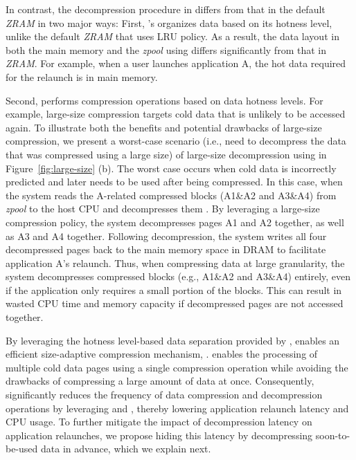  

In contrast, the decompression procedure in \proposal differs from that in the default \emph{ZRAM} in two major ways:
First, \proposal's \dataorg organizes data based on its hotness level, unlike the default \emph{ZRAM} that uses LRU policy. As a result, the data layout in both the main memory and the \emph{zpool} using \proposal differs significantly from that in \emph{ZRAM}. For example, when a user launches application A, the hot data required for the relaunch is in main memory. 

Second, \proposal performs compression operations based on data hotness levels. For example, large-size compression targets cold data that is unlikely to be accessed again. To illustrate both the benefits and potential drawbacks of large-size compression, we present a worst-case scenario (i.e., need to decompress the data that was compressed using a large size) of large-size decompression using \proposal in Figure~\ref{fig:large-size} (b). The worst case occurs when cold data is incorrectly predicted and later needs to be used after being compressed. In this case, when the system reads the A-related compressed blocks (A1\&A2 and A3\&A4) from  \emph{zpool} to the host CPU and decompresses them . By leveraging a large-size compression policy, the system decompresses pages A1 and A2 together, as well as A3 and A4 together. Following decompression, the system writes all four decompressed pages back to the main memory space in DRAM  to facilitate application A's relaunch. 
Thus, when compressing data at large granularity, the system decompresses compressed blocks (e.g., A1\&A2 and A3\&A4) entirely, even if the application only requires a small portion of the blocks. This can result in wasted CPU time and memory capacity if decompressed pages are not accessed together.

 

By leveraging the hotness level-based data separation provided by \dataorg, \proposal enables an efficient size-adaptive compression mechanism, \compress. \compress enables the processing of multiple cold data pages using a single compression operation while avoiding the drawbacks of compressing a large amount of data at once. Consequently, \proposal significantly reduces the frequency of data compression and decompression operations by leveraging \dataorg and \compress, thereby lowering application relaunch latency and CPU usage. To further mitigate the impact of decompression latency on application relaunches, we propose hiding this latency by decompressing soon-to-be-used data in advance, which we explain next.


